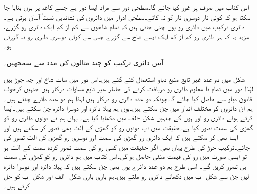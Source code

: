 اس کتاب میں صرف  پر غور کیا جائے گا۔سطحی دور سے مراد ایسا دور ہے جسے کاغذ پر یوں بنایا جا سکتا ہو کہ کوئی تار دوسری تار کو نہ کاٹے۔سطحی ادوار میں دائروں کی نشاندہی نسبتاً آسان ہوتی ہے۔دائری ترکیب میں دائری رو یوں چنی جاتی ہیں کہ تمام شاخوں سے کم از کم ایک دائری رو گزرے، مزید یہ کہ ہر دائری رو کم از کم ایک ایسے شاخ سے گزرے جس سے کوئی دوسری دائری رو نہ گزرتی ہو۔

آئیں دائری ترکیب کو چند مثالوں کی مدد سے سمجھیں۔

 شکل  میں دو عدد غیر تابع منبع دباو استعمال کئے گئے ہیں۔اس دور میں  سات شاخ اور چھ جوڑ ہیں لہٰذا دور میں تمام نا معلوم دائری رو دریافت کرنے کی خاطر  غیر تابع مساوات درکار ہیں جنہیں کرخوف قانون دباو سے حاصل کیا جائے گا۔چونکہ دو عدد دائری رو درکار ہیں لہٰذا ہم دو عدد دائرے چنتے ہیں۔ہم ان دائروں کو مختلف انداز میں چن سکتے ہیں۔یوں ہم پہلا دائرہ  اور دوسرا دائرہ  چن سکتے ہیں۔ایسا کرتے ہوئے دائری رو  اور  ہوں گے جنہیں  شکل -الف میں دکھایا گیا ہے۔ یہاں ہم نے دونوں دائری رو کو گھڑی کی سمت تصور کیا ہے۔حقیقت میں آپ دونوں رو کو گھڑی کے الٹ بھی تصور کر سکتے ہیں اور ایسا بھی کر سکتے ہیں کہ ایک دائری رو گھڑی کی سمت اور دوسری رو گھڑی کی الٹ تصور کی جائے۔ترکیب جوڑ کی طرح یہاں بھی اگر حقیقت میں کسی رو کی سمت تصور کردہ سمت کے الٹ ہو تو ایسی صورت میں رو کی قیمت منفی حاصل ہو گی۔اس کتاب میں ہم دائری رو کو گھڑی کی سمت ہی تصور کریں گے۔ اسی طرح ہم دو عدد دائرے یوں بھی چن سکتے ہیں کہ پہلا دائرہ  اور دوسرا دائرہ  لیں جن سے شکل -ب میں دکھائے دائری رو ملتے ہیں۔ہم باری باری شکل -الف اور شکل -ب کو حل کرتے ہیں۔

